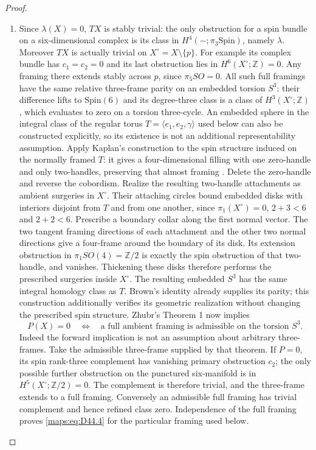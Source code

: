 \begin{proof}
\begin{enumerate}[label=\arabic*.,leftmargin=*]
\item Since $\lambda(X)=0$, $TX$ is stably trivial: the only obstruction
for a spin bundle on a six-dimensional complex is its class in
$H^4(-;\pi_3\mathrm{Spin})$, namely $\lambda$.
Moreover $TX$ is actually trivial on $X^\circ=X\setminus\{p\}$.
For example its complex bundle has $c_1=c_2=0$ and its last
obstruction lies in $H^6(X^\circ;\mathbb Z)=0$.
Any framing there extends stably across $p$, since
$\pi_5SO=0$. All such full framings have the same relative
three-frame parity on an embedded torsion $S^3$: their difference
lifts to $\mathrm{Spin}(6)$ and its degree-three class is a class
of $H^3(X^\circ;\mathbb Z)$, which evaluates to zero on a torsion
three-cycle.
An embedded sphere in the integral class of the regular torus
$T=\langle e_1,e_2,\gamma\rangle$ used below can also be
constructed explicitly, so its existence is not an additional
representability assumption. Apply Kaplan's construction to
the spin structure induced on the normally framed $T$:
it gives a four-dimensional filling with one zero-handle and
only two-handles, preserving that almost framing
\cite[Definition 1.7, Remark 1.8, Theorem 3.1]{mapsKaplan79}.
Delete the zero-handle and reverse the cobordism. Realize the
resulting two-handle attachments as ambient surgeries in
$X^\circ$. Their attaching circles bound embedded disks
with interiors disjoint from $T$ and from one another, since
$\pi_1(X^\circ)=0$, $2+3<6$ and $2+2<6$.
Prescribe a boundary collar along the first normal vector.
The two tangent framing directions of each attachment and
the other two normal directions give a four-frame around
the boundary of its disk. Its extension obstruction in
$\pi_1SO(4)=\mathbb Z/2$ is exactly the spin obstruction
of that two-handle, and vanishes. Thickening these disks
therefore performs the prescribed surgeries inside $X^\circ$.
The resulting embedded $S^3$ has the same integral homology
class as $T$. Brown's identity already supplies its parity;
this construction additionally verifies its geometric
realization without changing the prescribed spin structure.
Zhubr's Theorem 1 now implies
\[
 P(X)=0\quad\Longleftrightarrow\quad
 \text{a full ambient framing is admissible on the torsion }S^3.
                                                               \tag{D44.4}\label{maps:eq:D44.4}
\]
Indeed the forward implication is not an assumption about arbitrary
three-frames. Take the admissible three-frame supplied by that
theorem. If $P=0$, its spin rank-three complement has vanishing
primary obstruction $c_2$; the only possible further obstruction
on the punctured six-manifold is in $H^5(X^\circ;\mathbb Z/2)=0$.
The complement is therefore trivial, and the three-frame extends
to a full framing. Conversely an admissible full framing has
trivial complement and hence refined class zero. Independence
of the full framing proves \eqref{maps:eq:D44.4} for the particular framing
used below.


\end{enumerate}
\end{proof}
